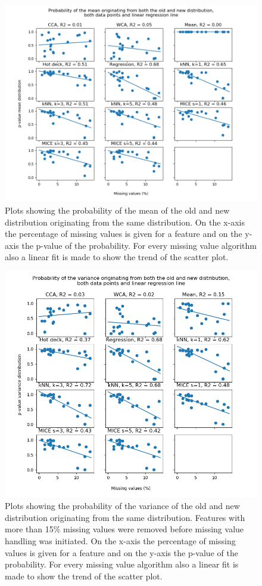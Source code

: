 \documentclass[10pt,a4paper]{article}
\begin{document}
		\begin{figure}[H]
		\centering
		\includegraphics[width=\textwidth]{Mean_Dist_Extra_ACA.PNG}
		\caption{Plots showing the probability of the mean of the old and new distribution originating from the same distribution. On the x-axis the percentage of missing values is given for a feature and on the y-axis the p-value of the probability. For every missing value algorithm also a linear fit is made to show the trend of the scatter plot.}
		\label{fig:PMeanFitsACA}
	\end{figure}
	
	\begin{figure}[H]
		\centering
		\includegraphics[width=\textwidth]{Var_Dist_Extra_ACA.PNG}
		\caption{Plots showing the probability of the variance of the old and new distribution originating from the same distribution. Features with more than 15\% missing values were removed before missing value handling was initiated. On the x-axis the percentage of missing values is given for a feature and on the y-axis the p-value of the probability. For every missing value algorithm also a linear fit is made to show the trend of the scatter plot.}
		\label{fig:PVarianceFitsACA}
	\end{figure}
	
\end{document}
